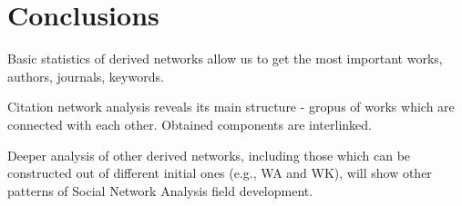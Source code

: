 \documentclass[11pt]{article} %
\begin{document}
\section{Conclusions}

Basic statistics of derived networks allow us to get the most important works, authors, journals, keywords. \medskip

Citation network analysis reveals its main structure - gropus of works which are connected with each other. Obtained components are interlinked. \medskip

Deeper analysis of other derived networks, including those which can be constructed out of different initial ones (e.g., WA and WK), will show other patterns of Social Network Analysis field development. 

\end{document}
